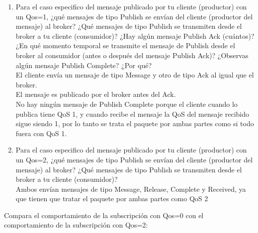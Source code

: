 \documentclass[12pt, a4paper]{report}
\begin{document}
\begin{enumerate}
	\item Para el caso especifico del mensaje publicado por tu cliente (productor) con un Qos=1, ¿qué
	mensajes de tipo Publish se envían del cliente (productor del mensaje) al broker? ¿Qué mensajes
	de tipo Publish se transmiten desde el broker a tu cliente (consumidor)? ¿Hay algún mensaje
	Publish Ack (cuántos)? ¿En qué momento temporal se transmite el mensaje de Publish desde
	el broker al consumidor (antes o después del mensaje Publish Ack)? ¿Observas algún mensaje
	Publish Complete? ¿Por qué?\\
	
	El cliente envía un mensaje de tipo Message y otro de tipo Ack al igual que el broker.\\
	El mensaje es publicado por el broker antes del Ack.\\
	No hay ningún mensaje de Publish Complete porque el cliente cuando lo publica tiene QoS 1, y cuando recibe el mensaje la QoS del mensaje recibido sigue siendo 1, por lo tanto se trata el paquete por ambas partes como si todo fuera con QoS 1.
	\item Para el caso especifico del mensaje publicado por tu cliente (productor) con un Qos=2, ¿qué
	mensajes de tipo Publish se envían del cliente (productor del mensaje) al broker? ¿Qué mensajes
	de tipo Publish se transmiten desde el broker a tu cliente (consumidor)?\\
	
	Ambos envían mensajes de tipo Message, Release, Complete y Received, ya que tienen que tratar el paquete por ambas partes como QoS 2
\end{enumerate}
Compara el comportamiento de la subscripción con Qos=0 con el comportamiento de la subscripción
con Qos=2:
\end{document}

